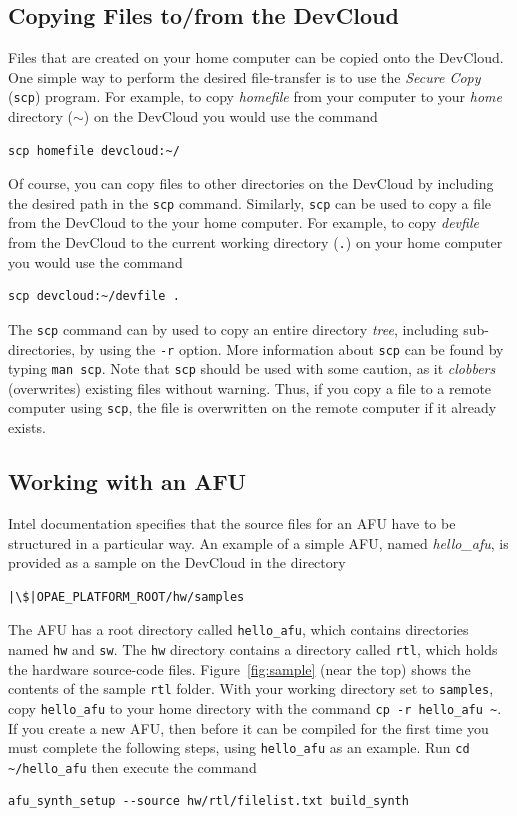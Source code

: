 \documentclass[11pt, twoside, pdftex]{article}
\begin{document}
\subsection{Copying Files to/from the DevCloud}
Files that are created on your home computer can be copied onto the DevCloud. One simple
way to perform the desired file-transfer is to use the {\it Secure Copy} (\texttt{scp}) program. 
For example, to copy {\it homefile} from your computer to your
{\it home} directory ($\sim$) on the DevCloud you would use the command
\begin{lstlisting}
scp homefile devcloud:~/
\end{lstlisting}

Of course, you can copy files to other directories on the DevCloud by including the desired path
in the \texttt{scp} command. Similarly, \texttt{scp} can be used to copy a file from the 
DevCloud to the your home computer. For example, to copy {\it devfile} from the DevCloud to 
the current working directory (\texttt{.}) on your home computer you would use the command
\begin{lstlisting}
scp devcloud:~/devfile .
\end{lstlisting}

The \texttt{scp} command can by used to copy an entire directory {\it tree}, including 
sub-directories, by using the \texttt{-r} option. More information about \texttt{scp} can 
be found by typing \texttt{man scp}. Note that \texttt{scp} should be used with some
caution, as it {\it clobbers} (overwrites) existing files without warning. Thus, if you 
copy a file to a remote computer using \texttt{scp}, the file is overwritten on the remote 
computer if it already exists.

\subsection{Working with an AFU}
Intel documentation specifies that the source files for an AFU have to be structured in a
particular way. An example of a simple AFU, named {\it hello\_afu}, is provided as a sample 
on the DevCloud in the directory 
\begin{lstlisting}
|\$|OPAE_PLATFORM_ROOT/hw/samples
\end{lstlisting}
The AFU has a root directory called \texttt{hello\_afu}, which
contains directories named \texttt{hw} and \texttt{sw}. The \texttt{hw} directory contains a 
directory called \texttt{rtl}, which holds the hardware source-code files.
Figure~\ref{fig:sample} (near the top) shows the contents of the sample \texttt{rtl}
folder. With your working directory set to \texttt{samples}, copy \texttt{hello\_afu} to your home directory with the command \texttt{cp -r hello\_afu \textasciitilde}. If you create a new AFU, then before it can be compiled for the first time you must complete the following steps, using \texttt{hello\_afu} as an example. Run \texttt{cd \textasciitilde/hello\_afu} then execute the 
command
\begin{lstlisting}
afu_synth_setup --source hw/rtl/filelist.txt build_synth
\end{lstlisting}
\end{document}
